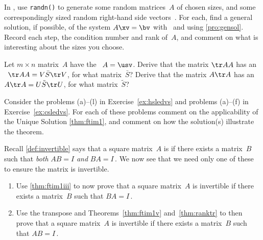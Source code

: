 \begin{exercise} \label{ex:} 
In \script, use \verb|randn()| to generate some random matrices~\(A\) of chosen sizes, and some correspondingly sized random right-hand side vectors~\bv.
For each, find a general solution, if possible, of the system \(A\xv=\bv\) with \script\ and using \autoref{pro:gensol}.
Record each step, the condition number and rank of~\(A\), and comment on what is interesting about the sizes you choose.
\end{exercise}


\begin{exercise} \label{ex:svdtrAA} 
Let \(m\times n\) matrix~\(A\) have the \svd\ \(A=\usv\).
Derive that the matrix \(\tr AA\) has an \svd\ \(\tr AA=V\bar S\tr V\), for what matrix~\(\bar S\)?
Derive that the matrix \(A\tr A\) has an \svd\ \(A\tr A=U\tilde S\tr U\), for what matrix~\(\tilde S\)?
\end{exercise}




\begin{exercise} \label{ex:} 
Consider the problems (a)--(l) in Exercise~\ref{ex:hsledvs} and problems (a)--(f) in Exercise~\ref{ex:csledvs}.
For each of these problems comment on the applicability of the Unique Solution \autoref{thm:ftim1}, and comment on how the solution(s) illustrate the theorem.
\end{exercise}



\begin{exercise} \label{ex:} 
Recall \autoref{def:invertible} says that a square matrix~\(A\) is  if there exists a matrix~\(B\) such that \emph{both} \(AB=I\) \emph{and} \(BA=I\)\,.
We now see that we need only one of these to ensure the matrix is invertible.
\begin{enumerate}
\item Use \autoref{thm:ftim1iii} to now prove that a square matrix~\(A\) is invertible if there exists a matrix~\(B\) such that \(BA=I\)\,.

\item Use the transpose and Theorems~\ref{thm:ftim1v} and~\ref{thm:ranktr} to then prove that a square matrix~\(A\) is invertible if there exists a matrix~\(B\) such that \(AB=I\)\,.
\end{enumerate}
\end{exercise}





